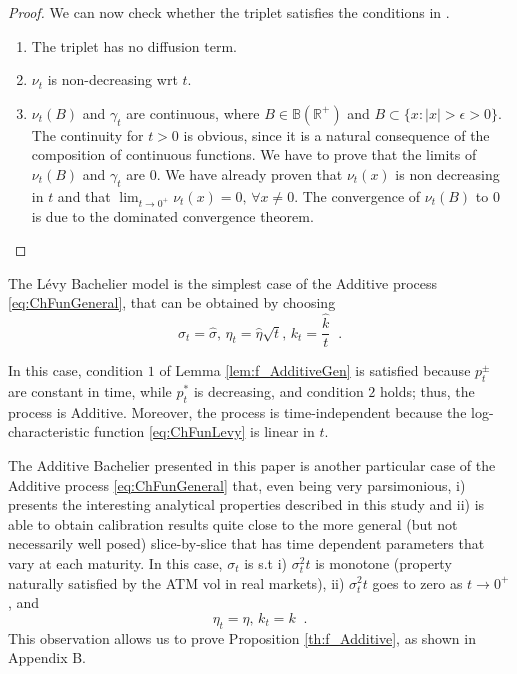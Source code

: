 \documentclass[12pt]{article}
\theoremstyle{definition}
\theoremstyle{remark}
\numberwithin{theorem}{section}
\numberwithin{proposition}{section}
\numberwithin{lemma}{section}
\numberwithin{corollary}{section}
\numberwithin{definition}{section}
\numberwithin{remark}{section}
\numberwithin{example}{section}
\newcommand{\R}{\mathbb{R}}
\begin{document}
\begin{proof}
\bigskip

We can now check whether the triplet satisfies the conditions in \cite{Sato}.
\begin{enumerate}
\item The triplet has no diffusion term.
\item $\nu_t$ is non-decreasing wrt $t$.
\item $\nu_t(B)$ and $\gamma_t$ are continuous, where $B\in \mathbb{B}(\R^+)$ and $B\subset\{x:|x|>\epsilon>0\}$. The continuity for $t>0$ is obvious, since it is a natural consequence of the composition of continuous functions. We have to prove that the limits of $\nu_t(B)$ and $\gamma_t$ are $0$. We have already proven that $\nu_t(x)$ is non decreasing in $t$ and that $\lim_{t\to0^+} \nu_t(x) = 0,\,\forall x\neq 0$. The convergence of $\nu_t(B)$ to $0$ is due to the dominated convergence theorem.
\end{enumerate}
\end{proof}

\smallskip

The L\'evy Bachelier model is the simplest case of the Additive process \eqref{eq:ChFunGeneral}, that can be obtained by choosing 
\[
\sigma_t= \hat{\sigma}  ,  \, \eta_t = \hat{\eta} \sqrt{t}  , \, k_t = \frac{ \hat{k} }{t} \;\; .
\]


In this case, condition $1$ of Lemma \ref{lem:f_AdditiveGen} is satisfied because $p^\pm_t$ are constant in time, while $p^*_t$ is decreasing, and
condition $2$ holds; thus, the process is Additive. 
Moreover, the process is time-independent because the log-characteristic function \eqref{eq:ChFunLevy} is linear in $t$.

\smallskip

The  Additive Bachelier presented in this paper is another particular case of the Additive process \eqref{eq:ChFunGeneral} that, even being very parsimonious, i) presents the interesting analytical properties described in this study and ii) is able to obtain calibration results quite close to the more general 
(but not necessarily well posed) slice-by-slice that has time dependent parameters that vary at each maturity. In this case, $\sigma_t$ is s.t i) $\sigma_t^2 t$ is monotone (property naturally satisfied by the ATM vol in real markets), ii) $\sigma_t^2 t$ goes to zero as $t\to0^+$, and
\[
\eta_t = \eta, \, k_t = k \;\; .
\]
This observation allows us to prove Proposition \ref{th:f_Additive}, as shown in Appendix B.
\end{document}
